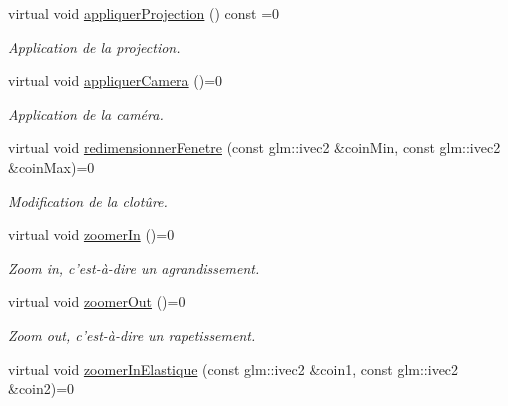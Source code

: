\begin{DoxyCompactItemize}
\item 
\hypertarget{classvue_1_1_vue_a725bd3f8d78f4a412e2e9ee10e544295}{virtual void \hyperlink{classvue_1_1_vue_a725bd3f8d78f4a412e2e9ee10e544295}{appliquer\-Projection} () const =0}\label{classvue_1_1_vue_a725bd3f8d78f4a412e2e9ee10e544295}

\begin{DoxyCompactList}\small\item\em Application de la projection. \end{DoxyCompactList}\item 
\hypertarget{classvue_1_1_vue_a7679208d1fc4667de94c058e313c1433}{virtual void \hyperlink{classvue_1_1_vue_a7679208d1fc4667de94c058e313c1433}{appliquer\-Camera} ()=0}\label{classvue_1_1_vue_a7679208d1fc4667de94c058e313c1433}

\begin{DoxyCompactList}\small\item\em Application de la caméra. \end{DoxyCompactList}\item 
\hypertarget{classvue_1_1_vue_aee55f95ee78ff1588baf1cb1768b6bfe}{virtual void \hyperlink{classvue_1_1_vue_aee55f95ee78ff1588baf1cb1768b6bfe}{redimensionner\-Fenetre} (const glm\-::ivec2 \&coin\-Min, const glm\-::ivec2 \&coin\-Max)=0}\label{classvue_1_1_vue_aee55f95ee78ff1588baf1cb1768b6bfe}

\begin{DoxyCompactList}\small\item\em Modification de la clotûre. \end{DoxyCompactList}\item 
\hypertarget{classvue_1_1_vue_af2fbeaeb97b40dc71d755d4f5e185ab2}{virtual void \hyperlink{classvue_1_1_vue_af2fbeaeb97b40dc71d755d4f5e185ab2}{zoomer\-In} ()=0}\label{classvue_1_1_vue_af2fbeaeb97b40dc71d755d4f5e185ab2}

\begin{DoxyCompactList}\small\item\em Zoom in, c'est-\/à-\/dire un agrandissement. \end{DoxyCompactList}\item 
\hypertarget{classvue_1_1_vue_a90d184491ccfb6a93839a2e9bd48bac1}{virtual void \hyperlink{classvue_1_1_vue_a90d184491ccfb6a93839a2e9bd48bac1}{zoomer\-Out} ()=0}\label{classvue_1_1_vue_a90d184491ccfb6a93839a2e9bd48bac1}

\begin{DoxyCompactList}\small\item\em Zoom out, c'est-\/à-\/dire un rapetissement. \end{DoxyCompactList}\item 
\hypertarget{classvue_1_1_vue_a1992e78b23c4b3ece118f44f35b97c0e}{virtual void \hyperlink{classvue_1_1_vue_a1992e78b23c4b3ece118f44f35b97c0e}{zoomer\-In\-Elastique} (const glm\-::ivec2 \&coin1, const glm\-::ivec2 \&coin2)=0}\label{classvue_1_1_vue_a1992e78b23c4b3ece118f44f35b97c0e}


\end{DoxyCompactItemize}
